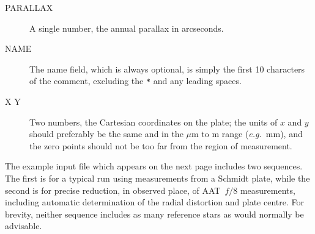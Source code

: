 \documentclass[twoside,11pt]{article}
\newcommand{\xlabel}[1]{}
\renewcommand{\_}{\texttt{\symbol{95}}}
\begin{document}
\begin{description}
\goodbreak
\item[\xlabel{PARALLAX}PARALLAX]\mbox{}

A single number, the annual parallax in arcseconds.

\goodbreak
\item[\xlabel{NAME}NAME]\mbox{}

The name field, which is always optional, is simply the first 10
characters of the comment, excluding the \texttt{*} and any leading
spaces.

\goodbreak
\item[\xlabel{X_Y}X Y]\mbox{}

Two numbers, the Cartesian coordinates on the plate; the units of $x$
and $y$ should preferably be the same and in the $\mu$m to m range
(\emph{e.g.}\ mm), and the zero points should not be too far from the
region of measurement.

\end{description}

The example input file which appears on the next page includes two
sequences.  The first is for a typical run using measurements from a
Schmidt plate, while the second is for precise reduction, in observed
place, of AAT~$f/8$ measurements, including automatic determination of
the radial distortion and plate centre.  For brevity, neither sequence
includes as many reference stars as would normally be advisable.
\end{document}
